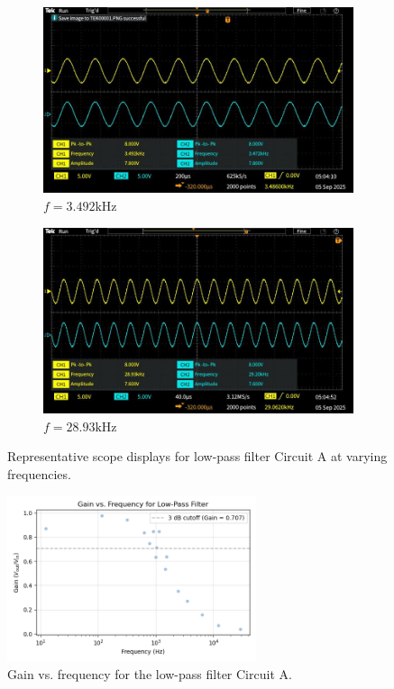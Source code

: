 \documentclass{article}
\begin{document}
\begin{figure}[H]
    \begin{subfigure}[b]{0.45\linewidth}
        \includegraphics[width=\linewidth]{2.1.cc.png}
        \caption{$f = 3.492\si{\kilo\hertz}$}
    \end{subfigure}
    \hfill
    \begin{subfigure}[b]{0.45\linewidth}
        \includegraphics[width=\linewidth]{2.1.cd.png}
        \caption{$f = 28.93\si{\kilo\hertz}$}
    \end{subfigure}

    \caption{Representative scope displays for low-pass filter Circuit A at varying frequencies.}
    \label{fig:low_pass}
\end{figure}


\begin{figure}[H]
    \centering
    \includegraphics[width=0.65\textwidth]{2.1.cgain.png}
    \caption{Gain vs. frequency for the low-pass filter Circuit A.}
    \label{fig:gain_lowpass}
\end{figure}
\end{document}
